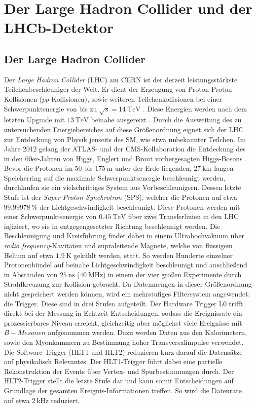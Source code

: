 \chapter{Der Large Hadron Collider und der LHCb-Detektor}
\label{chap:3}
%
\section{Der Large Hadron Collider}
%
Der \textit{Large Hadron Collider} (LHC) \cite{lhc} am CERN ist der derzeit leistungsstärkste Teilchenbeschleuniger der Welt. Er dient der Erzeugung von Proton-Proton-Kollisionen ($pp$-Kollisionen), sowie weiteren Teilchenkollisionen bei einer Schwerpunktenergie von bis zu $\sqrt{s}=\SI{14}{\tera\electronvolt}$ \cite{lhc}. Diese Energien werden nach dem letzten Upgrade mit $\SI{13}{\tera\electronvolt}$ beinahe ausgereizt \cite{lhc}. Durch die Ausweitung des zu untersuchenden Energiebereiches auf diese Größenordnung eignet sich der LHC zur Entdeckung von Physik jenseits des SM, wie etwa unbekannter Teilchen. Im Jahre 2012 gelang der ATLAS- und der CMS-Kollaboration die Entdeckung des in den 60er-Jahren von Higgs, Englert und Brout vorhergesagten Higgs-Bosons \cite{higgs_atlas, higgs_cms}.\\
Bevor die Protonen im 50 bis $\SI{175}{\meter}$ \cite{lhc} unter der Erde liegenden, $\SI{27}{\kilo\meter}$ langen Speicherring auf die maximale Schwerpunktsenergie beschleunigt werden, durchlaufen sie ein vielschrittiges System aus Vorbeschleunigern. Dessen letzte Stufe ist der \textit{Super Proton Synchrotron} (SPS), welcher die Protonen auf etwa $\SI{99,99978}{\percent}$ der Lichtgeschwindigkeit beschleunigt\cite{lhc}. Diese Protonen werden mit einer Schwerpunktsenergie von $\SI{0,45}{\tera\electronvolt}$ über zwei Transferlinien in den LHC injiziert, wo sie in entgegengesetzter Richtung beschleunigt werden. Die Beschleunigung und Kreisführung findet dabei in einem Ultrahochvakuum über \textit{radio frequency}-Kavitäten und supraleitende Magnete, welche von flüssigem Helium auf etwa $\SI{1,9}{\kelvin}$ gekühlt werden, statt. So werden Hunderte einzelner Protonenbündel auf beinahe Lichtgeschwindigkeit beschleunigt und anschließend in Abständen von $\SI{25}{\nano\second}$
($\SI{40}{\mega\hertz}$) in einem der vier großen Experimente durch Strahlkreuzung zur Kollision gebracht. Da Datenmengen in dieser Größenordnung nicht gespeichert werden können, wird ein mehrstufiges Filtersystem angewendet: die Trigger. Diese sind in drei Stufen aufgeteilt. Der Hardware Trigger \textsc{L0} trifft direkt bei der Messung in Echtzeit Entscheidungen, sodass die Ereignisrate ein prozessierbares Niveau erreicht, gleichzeitig aber möglichst viele Ereignisse mit $B-Mesonen$ aufgenommen werden. Dazu werden Daten aus den Kalorimetern, sowie den Myonkammern zu Bestimmung hoher Transversalimpulse verwendet. Die Software Trigger (\textsc{HLT1} und \textsc{HLT2}) reduzieren kurz darauf die Datensätze auf physikalisch Relevantes. Der HLT1-Trigger führt dabei eine partielle Rekonstruktion der Events über Vertex- und Spurbestimmungen durch. Der HLT2-Trigger stellt die letzte Stufe dar und kann somit Entscheidungen auf Grundlage der gesamten Ereignis-Informationen treffen. So wird die Datenrate auf etwa $\SI{2}{\kilo\hertz}$ reduziert.
%
